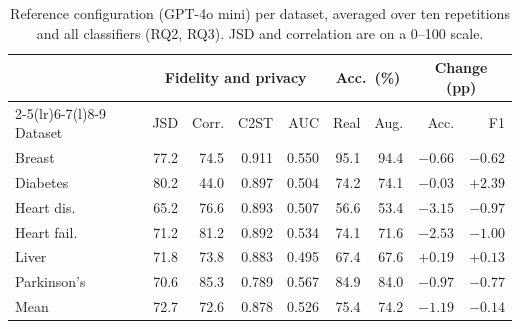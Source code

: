 \documentclass[conference]{IEEEtran}
\begin{document}
\begin{table}[t]
\centering
\caption{Reference configuration (GPT-4o mini) per dataset, averaged over ten repetitions and all classifiers (RQ2, RQ3). JSD and correlation are on a 0--100 scale.}
\label{tab:full}
\footnotesize
\setlength{\tabcolsep}{2.2pt}
\begin{tabular*}{\columnwidth}{@{\extracolsep{\fill}}lrrrrrrrr@{}}
\toprule
& \multicolumn{4}{c}{Fidelity and privacy} & \multicolumn{2}{c}{Acc.\ (\%)} & \multicolumn{2}{c}{Change (pp)} \\
\cmidrule(lr){2-5}\cmidrule(lr){6-7}\cmidrule(l){8-9}
Dataset & JSD & Corr. & C2ST & AUC & Real & Aug. & Acc. & F1 \\
\midrule
Breast & 77.2 & 74.5 & 0.911 & 0.550 & 95.1 & 94.4 & $-0.66$ & $-0.62$ \\
Diabetes & 80.2 & 44.0 & 0.897 & 0.504 & 74.2 & 74.1 & $-0.03$ & $+2.39$ \\
Heart dis. & 65.2 & 76.6 & 0.893 & 0.507 & 56.6 & 53.4 & $-3.15$ & $-0.97$ \\
Heart fail. & 71.2 & 81.2 & 0.892 & 0.534 & 74.1 & 71.6 & $-2.53$ & $-1.00$ \\
Liver & 71.8 & 73.8 & 0.883 & 0.495 & 67.4 & 67.6 & $+0.19$ & $+0.13$ \\
Parkinson's & 70.6 & 85.3 & 0.789 & 0.567 & 84.9 & 84.0 & $-0.97$ & $-0.77$ \\
\midrule
Mean & 72.7 & 72.6 & 0.878 & 0.526 & 75.4 & 74.2 & $-1.19$ & $-0.14$ \\
\bottomrule
\end{tabular*}
\end{table}
\end{document}
